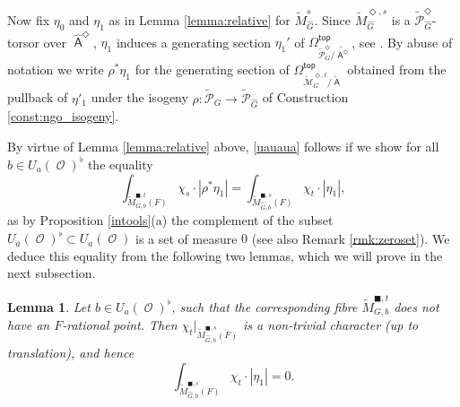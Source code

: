 \documentclass{article}
\DeclareMathOperator{\A}{\mathsf{A}}
\newcommand{\Mc}{\mathcal{M}}
\DeclareMathOperator{\Pc}{\mathcal{P}}
\DeclareMathOperator{\Oo}{\mathcal{O}}
\renewcommand{\top}{\mathsf{top}}
\newcommand{\wpc}{\widetilde{\mathcal{P}} }
\theoremstyle{definition}
\newtheorem{rmk}[definition]{Remark}
\theoremstyle{plain}
\newtheorem{lemma}[definition]{Lemma}
\begin{document}
Now fix $\eta_0$ and $\eta_1$ as in Lemma \ref{lemma:relative} for $\widetilde{M}_{\widehat{G}}^{s}$. Since $\widetilde{M}_{\widehat{G}}^{\Diamond,s}$ is a $\wpc^\Diamond_{\widehat{G}}$-torsor over $\widehat{\A}^\Diamond$, $\eta_1$ induces a generating section $\eta_1'$ of $\Omega^{\top}_{\wpc^{\Diamond}_{G}/\widetilde{\A^\Diamond}}$, see \cite[Lemma 4.9]{gwz}. By abuse of notation we write $\rho^*\eta_1$ for the generating section of $\Omega^{\top}_{\widetilde{\Mc}^{\Diamond,t}_{G}/\widetilde{\A}}$ obtained from the pullback of $\eta'_1$ under the isogeny $\rho: \wpc_G \to \wpc_{\widehat{G}}$ of Construction \ref{const:ngo_isogeny}.


By virtue of Lemma \ref{lemma:relative} above, \eqref{uauaua} follows if we show for all $b \in U_a(\Oo)^\flat$ the equality
\begin{equation*} \int_{ \widetilde{M}_{G,b}^{\blacksquare,t}(F) } \chi_s \cdot |\rho^*\eta_1| =  \int_{ \widetilde{M}_{\widehat{G},b}^{\blacksquare,s}(F) } \chi_t \cdot |\eta_1|, \end{equation*}
as by Proposition \ref{intools}(a) the complement of the subset $U_a(\Oo)^{\flat}\subset U_a(\Oo)$ is a set of measure $0$ (see also Remark \ref{rmk:zeroset}). We deduce this equality from the following two lemmas, which we will prove in the next subsection.




\begin{lemma}\label{lemma:0}
Let $b \in U_a(\Oo)^{\flat}$, such that the corresponding fibre $\widetilde{M}^{\blacksquare,t}_{G,b}$ does not have an $F$-rational point. Then $\chi_t|_{\widetilde{M}^{\blacksquare,s}_{\widehat{G},b}(F)}$ is a non-trivial character (up to translation), and hence 
$$\int_{ \widetilde{M}_{\widehat{G},b}^{\blacksquare,s}(F) } \chi_t \cdot{} |\eta_1| = 0.$$
\end{lemma}
\end{document}
